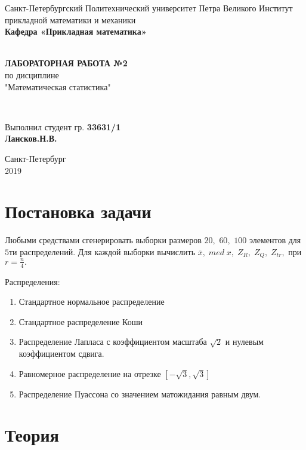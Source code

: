 \documentclass[12pt]{article}
\renewcommand{\listoffigures}{\begingroup  %
\tocsection
\tocfile{\listfigurename}{lof}
\endgroup}
\renewcommand{\listoftables}{\begingroup  %
\tocsection
\tocfile{\listtablename}{lot}
\endgroup}
\begin{document}
\begin{titlepage}
	\center
		Санкт-Петербургский Политехнический 
		университет Петра Великого
		Институт прикладной математики и механики
		\\ \textbf{Кафедра «Прикладная математика»}

	\vfill ~
	\textbf{
		\\ \large ЛАБОРАТОРНАЯ РАБОТА №2
	}
	\\	по дисциплине 
	\\	"Математическая статистика"

	\vfill ~

	Выполнил студент гр. \textbf{33631/1} \\
	\textbf{Лансков.Н.В.} \\ 

\vfill

{\large}	Санкт-Петербург
\\ 2019
\end{titlepage}


\tableofcontents 
\newpage
\listoftables
\newpage

\section{Постановка задачи}
Любыми средствами сгенерировать выборки размеров $20,$ $60,$ $100$ элементов для $5$ти распределений. Для каждой выборки вычислить $\overline{x},\; med\; x,\; Z_R,\; Z_Q,\; Z_{tr},$ при $r = \frac{n}{4}.$

Распределения:
\begin{enumerate}
\item Стандартное нормальное распределение
\item Стандартное распределение Коши
\item Распределение Лапласа с коэффициентом масштаба $\sqrt{2}$ и нулевым коэффициентом сдвига.
\item Равномерное распределение на отрезке $\left[-\sqrt{3}, \sqrt{3}\right]$
\item Распределение Пуассона со значением матожидания равным двум.
\end{enumerate}

\section{Теория}
\end{document}
